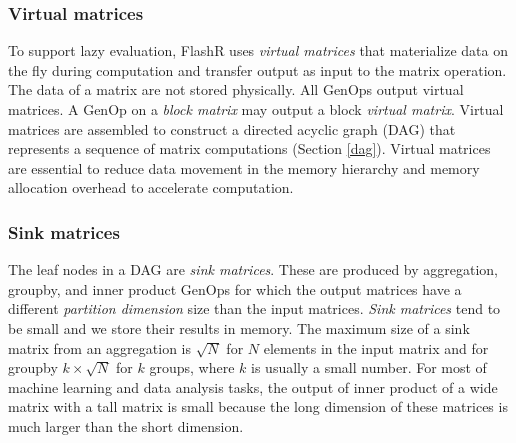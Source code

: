 
\subsubsection{Virtual matrices} \label{virt_mat}
To support lazy evaluation, FlashR uses \textit{virtual matrices} that
materialize data on the fly during computation and transfer output as input to
the matrix operation. The data of a matrix are not stored physically.
All GenOps output virtual matrices. A GenOp on a \textit{block matrix} may output
a block \textit{virtual matrix}. Virtual matrices are assembled to construct
a directed acyclic graph (DAG) that represents a sequence of matrix computations
(Section \ref{dag}). Virtual matrices are essential to reduce data
movement in the memory hierarchy and memory allocation overhead to accelerate
computation.

\subsubsection{Sink matrices}
The leaf nodes in a DAG are \textit{sink matrices}.
These are produced by aggregation, groupby, and inner product GenOps for which 
the output matrices have a different \textit{partition dimension} size than
the input matrices. \textit{Sink matrices} tend to be small and we store their
results in memory. The maximum size of a sink matrix from an aggregation
is $\sqrt{N}$ for $N$ elements in the input matrix and for groupby
$k \times \sqrt{N}$ for $k$ groups, where $k$ is usually a small number.
For most of machine learning and data analysis tasks, the output of inner product
of a wide matrix with a tall matrix is small because
the long dimension of these matrices is much larger than the short dimension.


